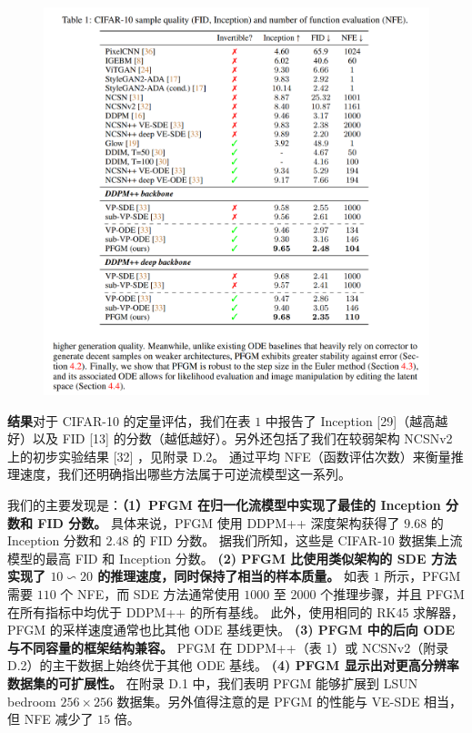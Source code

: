 \documentclass[hyperref,UTF-8]{ctexart}
\newcommand{\0}{\boldsymbol{0}}
\begin{document}
\begin{figure}[ht]
  \centering
  \includegraphics[width=1\textwidth]{img/table1.png}
\end{figure}

\textbf{结果}\quad 对于 CIFAR-10 的定量评估，我们在表 $1$ 中报告了 Inception [29]（越高越好）以及 FID [13] 的分数（越低越好）。另外还包括了我们在较弱架构 NCSNv2 上的初步实验结果 [32] ，见附录 D.2。 通过平均 NFE（函数评估次数）来衡量推理速度，我们还明确指出哪些方法属于可逆流模型这一系列。

我们的主要发现是：\textbf{（1）PFGM 在归一化流模型中实现了最佳的 Inception 分数和 FID 分数。} 具体来说，PFGM 使用 DDPM++ 深度架构获得了 $9.68$ 的 Inception 分数和 $2.48$ 的 FID 分数。 据我们所知，这些是 CIFAR-10 数据集上流模型的最高 FID 和 Inception 分数。 \textbf{(2) PFGM 比使用类似架构的 SDE 方法实现了 $10\backsim 20$ 的推理速度，同时保持了相当的样本质量。} 如表 $1$ 所示，PFGM 需要 $110$ 个 NFE，而 SDE 方法通常使用 $1000$ 至 $2000$ 个推理步骤，并且 PFGM 在所有指标中均优于 DDPM++ 的所有基线。 此外，使用相同的 RK45 求解器，PFGM 的采样速度通常也比其他 ODE 基线更快。 \textbf{(3) PFGM 中的后向 ODE 与不同容量的框架结构兼容。} PFGM 在 DDPM++（表 $1$）或 NCSNv2（附录 D.2）的主干数据上始终优于其他 ODE 基线。 \textbf{(4) PFGM 显示出对更高分辨率数据集的可扩展性。} 在附录 D.1 中，我们表明 PFGM 能够扩展到 LSUN bedroom $256\times 256$ 数据集。另外值得注意的是 PFGM 的性能与 VE-SDE 相当，但 NFE 减少了 $15$ 倍。
\end{document}
